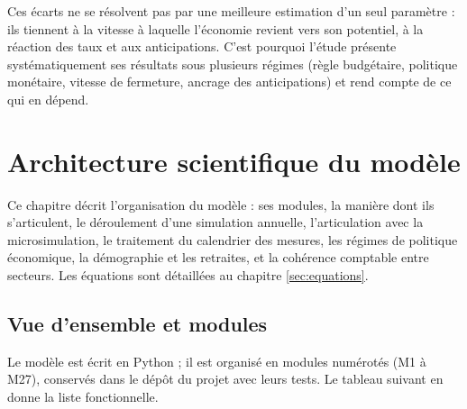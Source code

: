 \documentclass[
  11pt,
  11pt,
  a4paper,
  openany]{book}
\begin{document}
Ces écarts ne se résolvent pas par une meilleure estimation d'un seul
paramètre : ils tiennent à la vitesse à laquelle l'économie revient vers
son potentiel, à la réaction des taux et aux anticipations. C'est
pourquoi l'étude présente systématiquement ses résultats sous plusieurs
régimes (règle budgétaire, politique monétaire, vitesse de fermeture,
ancrage des anticipations) et rend compte de ce qui en dépend.

\hypertarget{sec:architecture}{%
\chapter{Architecture scientifique du modèle}\label{sec:architecture}}

Ce chapitre décrit l'organisation du modèle : ses modules, la manière
dont ils s'articulent, le déroulement d'une simulation annuelle,
l'articulation avec la microsimulation, le traitement du calendrier des
mesures, les régimes de politique économique, la démographie et les
retraites, et la cohérence comptable entre secteurs. Les équations sont
détaillées au chapitre \ref{sec:equations}.

\hypertarget{sec:modules}{%
\section{Vue d'ensemble et modules}\label{sec:modules}}

Le modèle est écrit en Python ; il est organisé en modules numérotés (M1
à M27), conservés dans le dépôt du projet avec leurs tests. Le tableau
suivant en donne la liste fonctionnelle.
\end{document}
